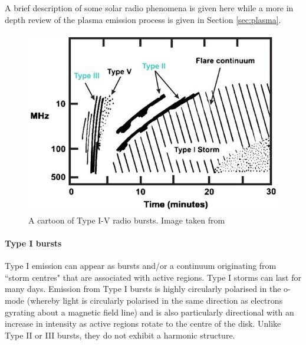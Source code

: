 A brief description of some solar radio phenomena is given here while a more in depth review of the plasma emission process is given in Section \ref{sec:plasma}.
\begin{figure}
    \centering
    \includegraphics[width=0.75\columnwidth]{Images/Burst_cartoon.jpg}
    \caption[Cartoon of Type I-V radio bursts]{A cartoon of Type I-V radio bursts. Image taken from \cite{Cliver2009}}
    \label{fig:burst_cartoon}
\end{figure}
\paragraph{Type I bursts}
Type I emission can appear as bursts and/or a continuum originating from ``storm centres" that are associated with active regions. Type I storms can last for many days. Emission from Type I bursts is highly circularly polarised in the o-mode (whereby light is circularly polarised in the same direction as electrons gyrating about a magnetic field line) and is also particularly directional with an increase in intensity as active regions rotate to the centre of the disk. Unlike Type II or III bursts, they do not exhibit a harmonic structure.
